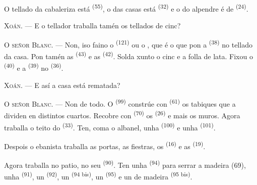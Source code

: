 
O tellado da cabaleriza está  \textsuperscript{(55)}, o das
casas está  \textsuperscript{(32)} e o do alpendre é de
 \textsuperscript{(24)}.

\textsc{Xoán}. --- E o tellador traballa tamén os tellados de cinc?

\textsc{O señor Blanc}. --- Non, iso faino o 
\textsuperscript{(121)} ou o , que é o que pon a 
\textsuperscript{(38)} no tellado da casa. Pon tamén as 
\textsuperscript{(43)} e as  \textsuperscript{(42)}. Solda
xunto o cinc e a folla de lata. Fixou o 
\textsuperscript{(40)} e a  \textsuperscript{(39)} no
 \textsuperscript{(36)}.

\textsc{Xoán}. --- E así a casa está rematada?

\VUsaut{3.0mm}
\VUsaut{3.0mm}

\textsc{O señor Blanc}. --- Non de todo. O  \textsuperscript{(99)}
constrúe con  \textsuperscript{(61)} os tabiques que a dividen en
distintos cuartos. Recobre con  \textsuperscript{(70)} os
 \textsuperscript{(26)} e mais os muros. Agora traballa o teito do
 \textsuperscript{(33)}. Ten, coma o albanel, unha 
\textsuperscript{(100)} e unha  \textsuperscript{(101)}.

Despois o ebanista traballa as portas, as fiestras, os 
\textsuperscript{(16)} e as  \textsuperscript{(19)}.

Agora traballa no patio, no seu  \textsuperscript{(90)}.
Ten unha  \textsuperscript{(94)} para serrar a madeira (69), unha
 \textsuperscript{(91)}, un  \textsuperscript{(92)}, un
 \textsuperscript{(94 bis)}, un 
\textsuperscript{(95)} e un  de madeira \textsuperscript{(95 bis)}.

